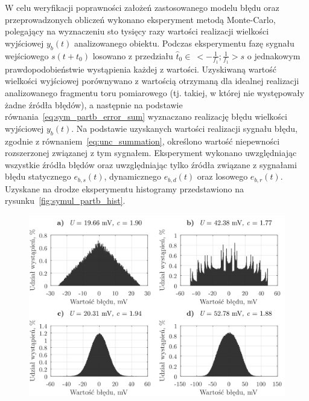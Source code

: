 W celu weryfikacji poprawności założeń zastosowanego modelu błędu oraz przeprowadzonych obliczeń wykonano eksperyment metodą Monte-Carlo, polegający na wyznaczeniu sto tysięcy razy wartości realizacji wielkości wyjściowej $y_{b}(t)$ analizowanego obiektu. Podczas eksperymentu fazę sygnału wejściowego $s(t+t_{0})$ losowano z przedziału $\hat{t}_{0} \in~<-\frac{1}{f_{1}};\frac{1}{f_{1}}>\unit{s}$ o jednakowym prawdopodobieństwie wystąpienia każdej z wartości. Uzyskiwaną wartość wielkości wyjściowej porównywano z wartością otrzymaną dla idealnej realizacji analizowanego fragmentu toru pomiarowego (tj. takiej, w której nie występowały żadne źródła błędów), a następnie na podstawie równania~\eqref{eq:sym_partb_error_sum} wyznaczano realizację błędu wielkości wyjściowej $y_{b}(t)$. Na podstawie uzyskanych wartości realizacji sygnału błędu, zgodnie z równaniem~\eqref{eq:unc_summation}, określono wartość niepewności rozszerzonej związanej z tym sygnałem. Eksperyment wykonano uwzględniając wszystkie źródła błędów oraz uwzględniając tylko źródła związane z sygnałami błędu statycznego $e_{b,s}(t)$, dynamicznego $e_{b,d}(t)$ oraz losowego $e_{b,r}(t)$. Uzyskane na drodze eksperymentu histogramy przedstawiono na rysunku~\ref{fig:symul_partb_hist}.

\begin{figure}[htb!]
\begin{center}
\includegraphics{obrazki/hist_part_b}
\end{center}
\end{figure}

